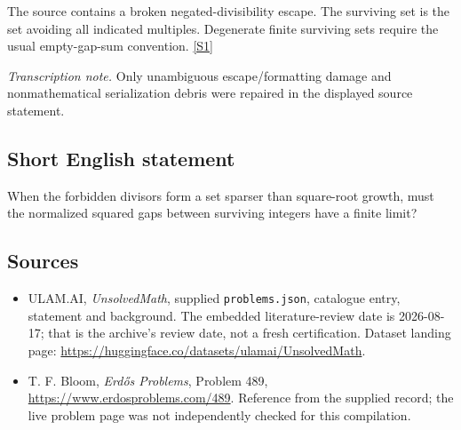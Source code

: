 \documentclass[11pt,a4paper]{article}
\newcommand{\sref}[2]{\hyperlink{source:#1:#2}{[S#2]}}
\begin{document}
The source contains a broken negated-divisibility escape. The surviving set is the set avoiding all indicated multiples. Degenerate finite surviving sets require the usual empty-gap-sum convention. \sref{statement}{1}

{\small\emph{Transcription note.} Only unambiguous escape/formatting damage and nonmathematical serialization debris were repaired in the displayed source statement.}

\subsection{Short English statement}

When the forbidden divisors form a set sparser than square-root growth, must the normalized squared gaps between surviving integers have a finite limit?

\subsection{Sources}

{\small

\begin{itemize}

\item[\hypertarget{source:statement:1}{S1}] ULAM.AI, \emph{UnsolvedMath}, supplied \texttt{problems.json}, catalogue entry, statement and background. The embedded literature-review date is 2026-08-17; that is the archive’s review date, not a fresh certification. Dataset landing page: \url{https://huggingface.co/datasets/ulamai/UnsolvedMath}.

\item[\hypertarget{source:statement:2}{S2}] T. F. Bloom, \emph{Erdős Problems}, Problem 489, \url{https://www.erdosproblems.com/489}. Reference from the supplied record; the live problem page was not independently checked for this compilation.

\end{itemize}

}

\label{end:statement}
\end{document}
